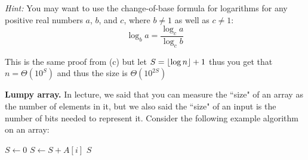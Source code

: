 \documentclass[11pt,addpoints]{exam}
\begin{document}
\begin{questions}
\begin{parts}
    \emph{Hint:} You may want to use the change-of-base formula for logarithms for any positive real numbers $a$, $b$, and $c$, where $b \neq 1$ as well as $c \neq 1$: 
    \[
        \log_{b} a = \frac{\log_{c} a}{\log_{c} b}
    \]

    \begin{solution}
      This is the same proof from (c) but let $S=\lfloor\log n\rfloor+1$ thus you get that $n=\Theta(10^S)$ and thus the size is $\Theta(10^{2S})$
    \end{solution}
\end{parts}

\newpage

    \question \textbf{Lumpy array.}
    \printanswers
    In lecture, we said that you can measure the ``size" of an array as the number of elements in it, but we also said the ``size" of an input is the number of bits needed to represent it.  Consider the following example algorithm on an array:
       
    \begin{minipage}{\linewidth}
    \begin{algorithm}[H]
          \begin{algorithmic}[1]
            \State $S \gets 0$
                \State $S \gets S + A[i]$
            \EndFor
            \State \Return $S$
            \EndFunction
          \end{algorithmic}
    \end{algorithm}
    \end{minipage}

\end{questions}
\end{document}
